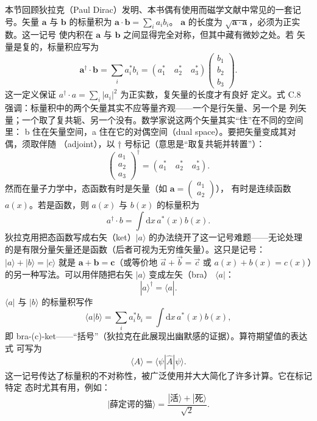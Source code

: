 本节回顾狄拉克（Paul Dirac）发明、本书偶有使用而磁学文献中常见的一套记号。矢量
$\mathbf{a}$ 与 $\mathbf{b}$ 的标量积为 $\mathbf{a}\cdot\mathbf{b}=\sum_ia_ib_i$。
$\mathbf{a}$ 的长度为 $\sqrt{\mathbf{a}\cdot\mathbf{a}}$，必须为正实数。这一记号
使内积在 $\mathbf{a}$ 与 $\mathbf{b}$ 之间显得完全对称，但其中藏有微妙之处。若
矢量是复的，标量积应写为
\begin{equation*}
\mathbf{a}^{\dagger}\cdot\mathbf{b} = \sum_ia_i^{*}b_i = (a_1^{*}\quad a_2^{*}\quad a_3^{*})\begin{pmatrix}b_1\\b_2\\b_3\end{pmatrix}.\tag{C.8}
\end{equation*}
这一定义保证 $a^{\dagger}\cdot a=\sum_i|a_i|^{2}$ 为正实数，复矢量的长度才有良好
定义。式 C.8 强调：标量积中的两个矢量其实不应等量齐观——一个是行矢量、另一个是
列矢量；一个取了复共轭、另一个没有。数学家说这两个矢量其实“住”在不同的空间里：
b 住在矢量空间，a 住在它的对偶空间（dual space）。要把矢量变成其对偶，须取伴随
（adjoint），以 † 号标记（意思是“取复共轭并转置”）：
\begin{equation*}
\begin{pmatrix}a_1\\a_2\\a_3\end{pmatrix}^{\dagger} = (a_1^{*}\quad a_2^{*}\quad a_3^{*}).\tag{C.9}
\end{equation*}
然而在量子力学中，态函数有时是矢量（如 $\mathbf{a}=\begin{pmatrix}a_1\\a_2\end{pmatrix}$），
有时是连续函数 $a(x)$。若是函数，则 $a(x)$ 与 $b(x)$ 的标量积为
\begin{equation*}
a^{\dagger}\cdot b = \int\mathrm{d}x\,a^{*}(x)b(x).\tag{C.10}
\end{equation*}
狄拉克用把态函数写成右矢（ket）$|a\rangle$ 的办法绕开了这一记号难题——无论处理
的是有限分量矢量还是函数（后者可视为无穷维矢量）。这只是记号：$|a\rangle+|b\rangle=|c\rangle$
就是 $\mathbf{a}+\mathbf{b}=\mathbf{c}$（或等价地 $\overrightarrow{a}+\overrightarrow{b}=\overrightarrow{c}$
或 $a(x)+b(x)=c(x)$）的另一种写法。可以用伴随把右矢 $|a\rangle$ 变成左矢（bra）
$\langle a|$：
\begin{equation*}
|a\rangle^{\dagger} = \langle a|.\tag{C.11}
\end{equation*}
$\langle a|$ 与 $|b\rangle$ 的标量积写作
\begin{equation*}
\langle a|b\rangle = \sum_ia_i^{*}b_i = \int\mathrm{d}x\,a^{*}(x)b(x),\tag{C.12}
\end{equation*}
即 bra-(c)-ket——“括号”（狄拉克在此展现出幽默感的证据）。算符期望值的表达式
可写为
\begin{equation*}
\langle\hat{A}\rangle = \langle\psi|\hat{A}|\psi\rangle.\tag{C.13}
\end{equation*}
这一记号传达了标量积的不对称性，被广泛使用并大大简化了许多计算。它在标记特定
态时尤其有用，例如：
\begin{equation*}
|\text{薛定谔的猫}\rangle = \frac{|\text{活}\rangle+|\text{死}\rangle}{\sqrt{2}}.\tag{C.14}
\end{equation*}

